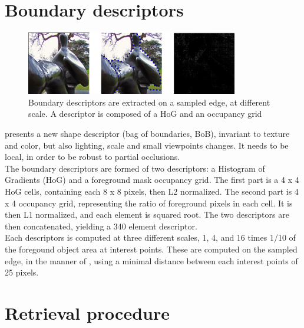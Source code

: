 \documentclass{article}
\begin{document}
\section{Boundary descriptors}

\begin{figure}

\label{boundary-descriptors}
\begin{center}
\includegraphics[width=350px]{images/desc.png}
\end{center}
\caption{Boundary descriptors are extracted on a sampled edge, at different
scale. A descriptor is composed of a HoG and an occupancy grid}
\end{figure}


\cite{Arandjelovic11} presents a new shape descriptor (bag of boundaries, BoB), invariant to texture
and color, but also lighting, scale and small viewpoints changes. It needs to
be local, in order to be robust to partial occlusions. \\
The boundary descriptors are formed of two descriptors: a Histogram of
Gradients (HoG) and a foreground mask occupancy grid. The first part is a
4 x 4 HoG cells, containing each 8 x 8 pixels, then L2 normalized. The second
part is 4 x 4 occupancy grid, representing the ratio of foreground pixels in
each cell. It is then L1 normalized, and each element is squared root. The two
descriptors are then concatenated, yielding a 340 element descriptor. \\
Each descriptors is computed at three different scales, 1, 4, and 16 times
1/10 of the foregound object area at interest points. These are computed  on the sampled
edge, in the manner of \cite{BelongieMP02}, using a minimal distance between
each interest points of 25 pixels.

\section{Retrieval procedure}
\end{document}
